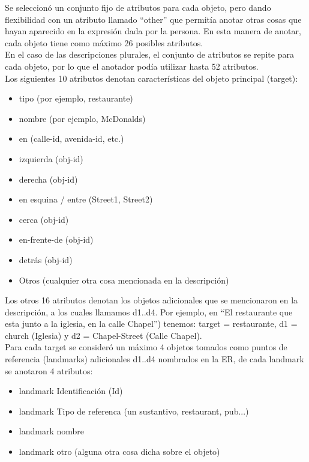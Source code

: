 
Se seleccion\'o un conjunto fijo de atributos para cada objeto, pero dando flexibilidad con un atributo llamado ``other'' que permit\'ia anotar otras cosas que hayan aparecido en la expresi\'on dada por la persona. En esta manera de anotar, cada objeto tiene como m\'aximo 26 posibles atributos.\\

En el caso de las descripciones plurales, el conjunto de atributos se repite para cada objeto, por lo que el anotador pod\'{i}a utilizar hasta 52 atributos.\\

Los siguientes 10 atributos denotan caracter\'isticas del objeto principal (target):
\begin{itemize}
  \item tipo (por ejemplo, restaurante)
  \item nombre (por ejemplo, McDonalds)
  \item en (calle-id, avenida-id, etc.)
  \item izquierda (obj-id)
  \item derecha (obj-id)
  \item en esquina / entre (Street1, Street2)
  \item cerca (obj-id)
  \item en-frente-de (obj-id)
  \item detr\'as (obj-id)
  \item Otros (cualquier otra cosa mencionada en la descripci\'on)
\end{itemize}
Los otros 16 atributos denotan los objetos adicionales que se mencionaron en la descripci\'on, a los cuales llamamos d1..d4. Por ejemplo, en ``El restaurante que esta junto a la iglesia, en la calle Chapel'') tenemos: target = restaurante, d1 = church (Iglesia) y d2 = Chapel-Street (Calle Chapel).\\

Para cada target se consider\'o un m\'aximo 4 objetos tomados como puntos de referencia (landmarks) adicionales d1..d4 nombrados en la ER, de cada landmark se anotaron 4 atributos:\\
\begin{itemize}
  \item landmark Identificaci\'on (Id)
  \item landmark Tipo de referenca (un sustantivo, restaurant, pub...)
  \item landmark nombre
  \item landmark otro (alguna otra cosa dicha sobre el objeto)
\end{itemize}

